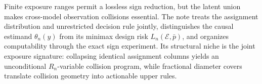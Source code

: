 Finite exposure ranges permit a lossless sign reduction, but the latent union makes cross-model observation collisions essential. The note treats the assignment distribution and unrestricted decision rule jointly, distinguishes the causal estimand \(\theta_n(y)\) from its minimax design risk \(L_n(\mathcal E,\bar p)\), and organizes computability through the exact sign experiment. Its structural niche is the joint exposure signature: collapsing identical assignment columns yields an unconditional \(R_n\)-variable collision program, while fractional diameter covers translate collision geometry into actionable upper rules.